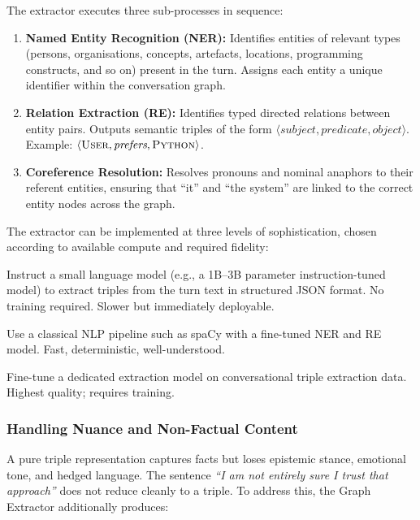 \documentclass[11pt, a4paper, twoside]{article}
\theoremstyle{definition}
\begin{document}
\medskip

The extractor executes three sub-processes in sequence:

\begin{enumerate}[leftmargin=*]
  \item \textbf{Named Entity Recognition (NER):} Identifies entities of relevant
    types (persons, organisations, concepts, artefacts, locations, programming
    constructs, and so on) present in the turn. Assigns each entity a unique
    identifier within the conversation graph.
  \item \textbf{Relation Extraction (RE):} Identifies typed directed relations
    between entity pairs. Outputs semantic triples of the form
    $\langle \textit{subject}, \textit{predicate}, \textit{object} \rangle$.
    Example: $\langle \textsc{User}, \textit{prefers}, \textsc{Python} \rangle$.
  \item \textbf{Coreference Resolution:} Resolves pronouns and nominal anaphors
    to their referent entities, ensuring that ``it'' and ``the system'' are
    linked to the correct entity nodes across the graph.
\end{enumerate}

The extractor can be implemented at three levels of sophistication, chosen
according to available compute and required fidelity:

\begin{description}[leftmargin=*, style=nextline]
  \item[Level 1 (Prompt-based):] Instruct a small language model (e.g.,
    a 1B--3B parameter instruction-tuned model) to extract triples from the
    turn text in structured JSON format. No training required. Slower but
    immediately deployable.
  \item[Level 2 (Pipeline-based):] Use a classical NLP pipeline such as
    spaCy with a fine-tuned NER and RE model. Fast, deterministic,
    well-understood.
  \item[Level 3 (Specialised):] Fine-tune a dedicated extraction model on
    conversational triple extraction data. Highest quality; requires training.
\end{description}

\subsubsection{Handling Nuance and Non-Factual Content}

A pure triple representation captures facts but loses epistemic stance, emotional
tone, and hedged language. The sentence \textit{``I am not entirely sure I trust
that approach''} does not reduce cleanly to a triple. To address this, the Graph
Extractor additionally produces:
\end{document}
